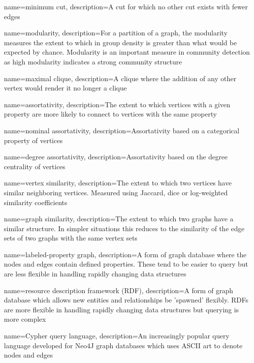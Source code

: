 {
    name={minimum cut},
    description={A cut for which no other cut exists with fewer edges}
}

{
    name={modularity},
    description={For a partition of a graph, the modularity measures the extent to which in group density is greater than what would be expected by chance.  Modularity is an important measure in community detection as high modularity indicates a strong community structure}
}

{
    name={maximal clique},
    description={A clique where the addition of any other vertex would render it no longer a clique}
}

{
    name={assortativity},
    description={The extent to which vertices with a given property are more likely to connect to vertices with the same property}
}

{
    name={nominal assortativity},
    description={Assortativity based on a categorical property of vertices}
}

{
    name={degree assortativity},
    description={Assortativity based on the degree centrality of vertices}
}

{
    name={vertex similarity},
    description={The extent to which two vertices have similar neighboring vertices.  Measured using Jaccard, dice or log-weighted similarity coefficients}
}

{
    name={graph similarity},
    description={The extent to which two graphs have a similar structure.  In simpler situations this reduces to the similarity of the edge sets of two graphs with the same vertex sets}
}

{
    name={labeled-property graph},
    description={A form of graph database where the nodes and edges contain defined properties.  These tend to be easier to query but are less flexible in handling rapidly changing data structures}
}

{
    name={resource description framework (RDF)},
    description={A form of graph database which allows new entities and relationships be 'spawned' flexibly.  RDFs are more flexible in handling rapidly changing data structures but querying is more complex}
}

{
    name={Cypher query language},
    description={An increasingly popular query language developed for Neo4J graph databases which uses ASCII art to denote nodes and edges}
}

